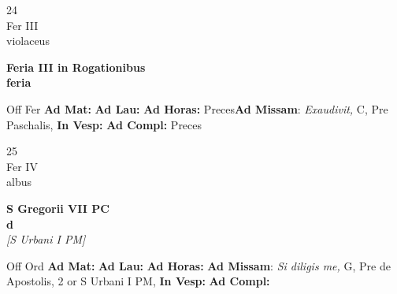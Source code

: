 \documentclass[10pt, openany]{book}
\begin{document}
        \begin{center}
            \begin{minipage}{3.5in}
                \vspace{2em}
                \begin{minipage}{0.5in}
                    {\Huge 24} \\
                    {\normalsize Fer III} \\
                    {\normalsize violaceus}
                \end{minipage}
                \begin{minipage}{3.0in}
                    \textbf{ \large Feria III in Rogationibus \\
                    \textnormal{\normalsize feria}} \\ 
                \end{minipage}
                \begin{justify}Off Fer
                    \textbf{Ad Mat: }
                    \textbf{Ad Lau: }
                    \textbf{Ad Horas: }Preces\textbf{Ad Missam}: \textit{Exaudivit,} C, Pre Paschalis,  
                    \textbf{In Vesp: }
                    \textbf{Ad Compl: }Preces
                \end{justify}
            \end{minipage}
        \end{center}
    
        \begin{center}
            \begin{minipage}{3.5in}
                \vspace{2em}
                \begin{minipage}{0.5in}
                    {\Huge 25} \\
                    {\normalsize Fer IV} \\
                    {\normalsize albus}
                \end{minipage}
                \begin{minipage}{3.0in}
                    \textbf{ \large S Gregorii VII PC \\
                    \textnormal{\normalsize d}} \\ \textit{[S Urbani I PM]} \\ 
                \end{minipage}
                \begin{justify}Off Ord
                    \textbf{Ad Mat: }
                    \textbf{Ad Lau: }
                    \textbf{Ad Horas: }\textbf{Ad Missam}: \textit{Si diligis me,} G, Pre de Apostolis, 2 or S Urbani I PM,  
                    \textbf{In Vesp: }
                    \textbf{Ad Compl: }
                \end{justify}
            \end{minipage}
        \end{center}
    
\end{document}
